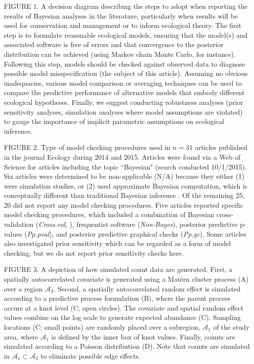 \documentclass[12pt,english]{article}
\begin{document}
\begin{spacing}{1.9}
FIGURE 1.  A decision diagram describing the steps to adopt when
reporting the results of Bayesian analyses in the literature,
particularly when results will be used for conservation and management
or to inform ecological theory.  The first step is to formulate
reasonable ecological models, ensuring that the model(s) and
associated software is free of errors and that convergence to the
posterior distribution can be achieved (using Markov chain Monte
Carlo, for instance).  Following this step, models should be checked
against observed data to diagnose possible model misspecification (the
subject of this article).  Assuming no obvious inadequacies, various
model comparison or averaging techniques can be used to compare the
predictive performance of alternative models that embody different
ecological hypotheses.  Finally, we suggest conducting robustness
analyses (prior sensitivity analyses, simulation analyses where model
assumptions are violated) to gauge the importance of implicit
parametric assumptions on ecological inference.

FIGURE 2.  Type of model checking procedures used in $n=31$ articles
published in the journal Ecology during 2014 and 2015. Articles were
found via a Web of Science for articles including the topic
``Bayesian" (search conducted 10/1/2015).  Six articles were
determined to be non-applicable (N/A) because they either (1) were
simulation studies, or (2) used approximate Bayesian computation,
which is conceptually different than traditional Bayesian inference
\citep[e.g.,][]{BeaumontEtAl2002}.  Of the remaining 25, 20 did not
report any model checking procedures.  Five articles reported specific
model checking procedures, which included a combination of Bayesian
cross-validation (\textit{Cross.val}, ), frequentist software
(\textit{Non-Bayes}), posterior predictive p-values
(\textit{Pp.pval}), and posterior predictive graphical checks
(\textit{Pp.gc}).  Some articles also investigated prior sensitivity
which can be regarded as a form of model checking, but we do not
report prior sensitivity checks here.

FIGURE 3.  A depiction of how simulated count data are generated.
First, a spatially autocorrelated covariate is generated using a
Mat\'{e}rn cluster process (A) over a region $\mathcal{A}_2$.  Second,
a spatially autocorrelated random effect is simulated according to a
predictive process formulation (B), where the parent process occurs at
a knot level (C; open circles).  The covariate and spatial random
effect values combine on the log scale to generate expected abundance
(C).  Sampling locations (C; small points) are randomly placed over a
subregion, $\mathcal{A}_1$ of the study area, where $\mathcal{A}_1$ is
defined by the inner box of knot values. Finally, counts are simulated
according to a Poisson distribution (D).  Note that counts are
simulated in $\mathcal{A}_1 \subset \mathcal{A}_2$ to eliminate
possible edge effects.


\end{spacing}
\end{document}
